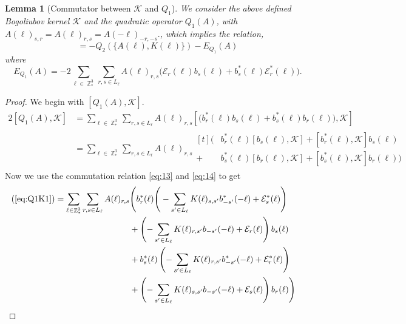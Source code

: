\documentclass[sn-mathphys, Numbered ,a4paper]{sn-jnl}%
\DeclareMathOperator{\Z}{\mathbb{Z}}
\theoremstyle{plain}
\newtheorem{lemma}[theorem]{Lemma}
\theoremstyle{definition}
\theoremstyle{remark}
\theoremstyle{plain}
\theoremstyle{definition}
\theoremstyle{remark}
\begin{document}
\begin{lemma}[Commutator between $\mathcal{K} $ and $Q_1$]\label{lem:Q1Kcomm}
 We consider the above defined Bogoliubov kernel $\mathcal{K}$ and the quadratic operator $Q_1(A)$, with $A(\ell)_{s,r} = A(\ell)_{r,s} = A(-\ell)_{-r,-s}.$, which implies the relation,
    \begin{equation}
        [ Q_1(A),\mathcal{K}] = -Q_2(\{A(\ell),K(\ell)\}) - E_{Q_1}(A)
    \end{equation}
 where
 \begin{equation}\label{eq:errKQ1}
     E_{Q_1}(A)=- 2 \sum\limits_{\ell \in \Z^3_*}\sum\limits_{r,s \in L_{\ell}}A(\ell)_{r,s}\Big(\mathcal{E}_{r}(\ell)b_{s}(\ell) + b^*_{s}(\ell)\mathcal{E}^*_{r}(\ell)\Big). 
 \end{equation}
\end{lemma}
\begin{proof}We begin with $[Q_1(A),\mathcal{K}]$.
    \begin{alignat}{2}
        [ Q_1(A),\mathcal{K}] &=\sum\limits_{\ell \in \Z^3_*}\sum\limits_{r,s \in L_{\ell}}A(\ell)_{r,s}\left[\Big(b^*_{r}(\ell)b_{s}(\ell) + b^*_{s}(\ell)b_{r}(\ell)\Big),\mathcal{K}\right]\nonumber\\
        &=\sum\limits_{\ell \in \Z^3_*}\sum\limits_{r,s \in L_{\ell}}A(\ell)_{r,s}\begin{aligned}[t]
            \Big(&b^*_{r}(\ell)\left[b_{s}(\ell),\mathcal{K}\right] +\left[b^*_{r}(\ell),\mathcal{K}\right]b_{s}(\ell)\\ + &b^*_{s}(\ell)\left[b_{r}(\ell),\mathcal{K}\right]+ \left[b^*_{s}(\ell),\mathcal{K}\right]b_{r}(\ell)\Big)
        \end{aligned}\label{eq:Q1K1}
    \end{alignat}
Now we use the commutation relation \eqref{eq:13} and \eqref{eq:14} to get
\begin{alignat}{2}
    (\ref{eq:Q1K1})&=\sum\limits_{\ell \in \Z^3_*}\sum\limits_{r,s \in L_{\ell}}A(\ell)_{r,s}\begin{aligned}[t]
        &\Bigg(b^*_{r}(\ell)\Bigg(-\sum\limits_{s'\in L_{\ell}}K(\ell)_{s,s'}b^*_{-s'}(-\ell) + \mathcal{E}^*_{s}(\ell)\Bigg)\\ &+ \left(-\sum\limits_{s'\in L_{\ell}}K(\ell)_{r,s'}b_{-s'}(-\ell) + \mathcal{E}_{r}(\ell)\right)b_{s}(\ell)\\&+ b^*_{s}(\ell)\left(-\sum\limits_{s'\in L_{\ell}}K(\ell)_{r,s'}b^*_{-s'}(-\ell) + \mathcal{E}^*_{r}(\ell)\right)\\ &+ \left(-\sum\limits_{s'\in L_{\ell}}K(\ell)_{s,s'}b_{-s'}(-\ell) + \mathcal{E}_{s}(\ell)\right)b_{r}(\ell) \Bigg)        

\end{aligned}
\end{alignat}
\end{proof}
\end{document}
